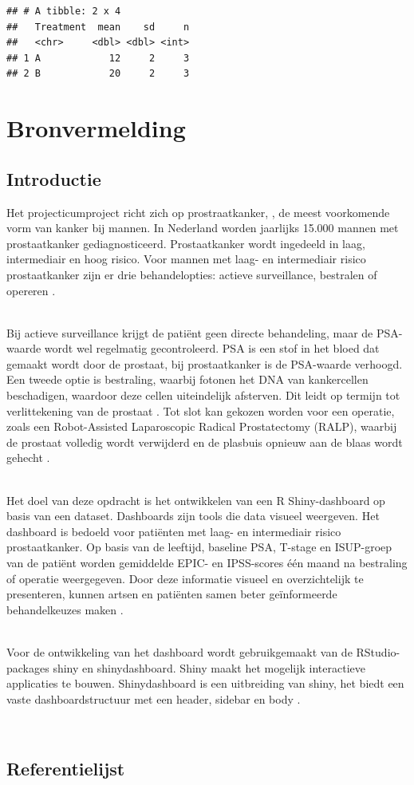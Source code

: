 \documentclass[
]{book}
\begin{document}
\begin{verbatim}
## # A tibble: 2 x 4
##   Treatment  mean    sd     n
##   <chr>     <dbl> <dbl> <int>
## 1 A            12     2     3
## 2 B            20     2     3
\end{verbatim}

\chapter{Bronvermelding}\label{bronvermelding}

\section{Introductie}\label{introductie-1}

Het projecticumproject richt zich op prostraatkanker, , de meest voorkomende vorm van kanker bij mannen. In Nederland worden jaarlijks 15.000 mannen met prostaatkanker gediagnosticeerd. Prostaatkanker wordt ingedeeld in laag, intermediair en hoog risico. Voor mannen met laag- en intermediair risico prostaatkanker zijn er drie behandelopties: actieve surveillance, bestralen of opereren \citep{CijfersProstaatkanker, BiologyProstateSpecificAntigen}.\\
\strut \\
Bij actieve surveillance krijgt de patiënt geen directe behandeling, maar de PSA-waarde wordt wel regelmatig gecontroleerd. PSA is een stof in het bloed dat gemaakt wordt door de prostaat, bij prostaatkanker is de PSA-waarde verhoogd. Een tweede optie is bestraling, waarbij fotonen het DNA van kankercellen beschadigen, waardoor deze cellen uiteindelijk afsterven. Dit leidt op termijn tot verlittekening van de prostaat \citep{BiologyProstateSpecificAntigen}. Tot slot kan gekozen worden voor een operatie, zoals een Robot-Assisted Laparoscopic Radical Prostatectomy (RALP), waarbij de prostaat volledig wordt verwijderd en de plasbuis opnieuw aan de blaas wordt gehecht \citep{OverviewMayoClinic}.\\
\strut \\
Het doel van deze opdracht is het ontwikkelen van een R Shiny-dashboard op basis van een dataset. Dashboards zijn tools die data visueel weergeven. Het dashboard is bedoeld voor patiënten met laag- en intermediair risico prostaatkanker. Op basis van de leeftijd, baseline PSA, T-stage en ISUP-groep van de patiënt worden gemiddelde EPIC- en IPSS-scores één maand na bestraling of operatie weergegeven. Door deze informatie visueel en overzichtelijk te presenteren, kunnen artsen en patiënten samen beter geïnformeerde behandelkeuzes maken \citep{ShinyDashboard}.\\
\strut \\
Voor de ontwikkeling van het dashboard wordt gebruikgemaakt van de RStudio-packages shiny en shinydashboard. Shiny maakt het mogelijk interactieve applicaties te bouwen. Shinydashboard is een uitbreiding van shiny, het biedt een vaste dashboardstructuur met een header, sidebar en body \citep{ShinyDashboard, zotero-item-18}.\\
\strut \\

\section{Referentielijst}\label{referentielijst}


\end{document}
